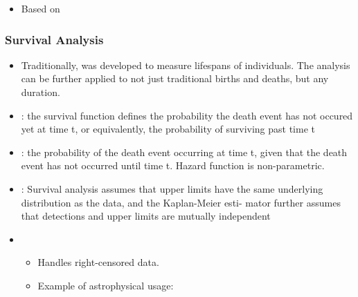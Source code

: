 \documentclass[letterpaper,10pt,english]{sphinxmanual}
\begin{document}
\begin{itemize}
\begin{itemize}
\item {} 
Based on 

\end{itemize}

\end{itemize}


\subsubsection{Survival Analysis}
\label{\detokenize{resource/programing/python_statistics:survival-analysis}}\begin{itemize}
\item {} 
Traditionally,  was
developed to measure lifespans of individuals. The analysis can be
further applied to not just traditional births and deaths, but any
duration.

\item {} 
: the survival function defines the probability
the death event has not occured yet at time t, or equivalently, the
probability of surviving past time t

\item {} 
: the probability of the death event occurring at
time t, given that the death event has not occurred until time t.
Hazard function is non-parametric.

\item {} 
: Survival analysis
assumes that upper limits have the same underlying distribution as
the data, and the Kaplan-Meier esti- mator further assumes that
detections and upper limits are mutually independent

\item {} 
\begin{itemize}
\item {} 
Handles right-censored data.

\item {} 
Example of astrophysical usage: 

\end{itemize}

\end{itemize}
\end{document}
